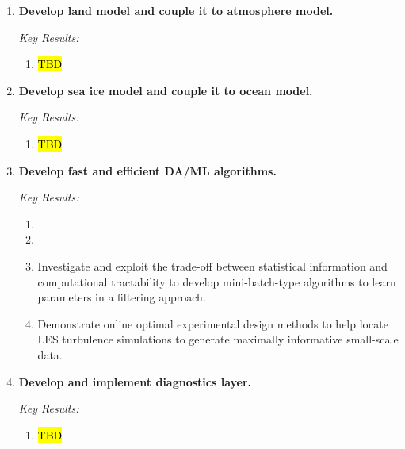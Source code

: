 \documentclass{article}
\begin{document}
\begin{enumerate}
\item \textbf{Develop land model and couple it to atmosphere model.}

   \emph{Key Results:}
     \begin{enumerate}
        \item \hl{TBD}
      \end{enumerate}
      
      \item \textbf{Develop sea ice model and couple it to ocean model.}

   \emph{Key Results:}
     \begin{enumerate}
        \item \hl{TBD}
      \end{enumerate}
    
    \item \textbf{Develop fast and efficient DA/ML algorithms.}
    
    \emph{Key Results:}
     \begin{enumerate}
        \item {}
        \item {}
        \item Investigate and exploit the trade-off between statistical information and computational tractability to develop mini-batch-type algorithms to learn parameters in a filtering approach.
        \item Demonstrate online optimal experimental design methods to help locate LES turbulence simulations to generate maximally informative small-scale data.
    \end{enumerate}

\item \textbf{Develop and implement diagnostics layer.}
    
    \emph{Key Results:}
     \begin{enumerate}
        \item \hl{TBD}
        \end{enumerate}
        

\end{enumerate}
\end{document}
